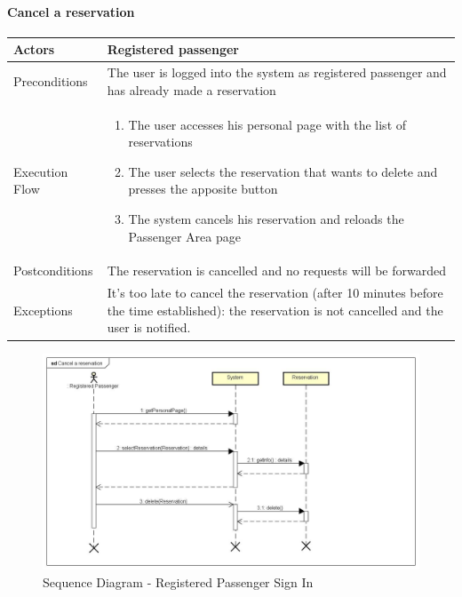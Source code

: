 \paragraph{Cancel a reservation}
\begin{center}
	\begin{tabular}{ | l | p{8cm} |}
		\hline Actors & Registered passenger
		\\ \hline
		Preconditions &
		The user is logged into the system as registered passenger and has already made
		a reservation
		\\ \hline
		Execution Flow &
		\begin{enumerate}
			\item The user accesses his personal page with the list of reservations
			\item The user selects the reservation that wants to delete and presses the apposite
			button
			\item The system cancels his reservation and reloads the Passenger Area page
		\end{enumerate}
		\\ \hline
		Postconditions & The reservation is cancelled and no requests will be forwarded
		\\ \hline
		Exceptions &
		It's too late to cancel the reservation (after 10 minutes before the time established):
		the reservation is not cancelled and the user is notified.
		\\ \hline
	\end{tabular}
\end{center}
\newpage
\begin{landscape}
\begin{figure}[!h]
	\begin{center}			
		\includegraphics[height=\textheight]{../SE2_SD/CancelAReservation}
		\caption{Sequence Diagram - Registered Passenger Sign In}	
	\end{center}
\end{figure}
\end{landscape}
\newpage
